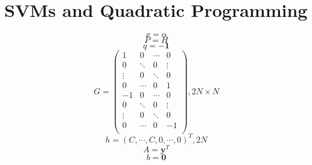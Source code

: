 \documentclass[11pt,abstract=on]{scrartcl}
\begin{document}
\section{SVMs and Quadratic Programming}
\begin{equation*}
x= \alpha
\end{equation*}
\begin{equation*}
P=H
\end{equation*}
\begin{equation*}
q=-\boldsymbol{1}
\end{equation*}
\begin{equation*}
G=\left( \begin{array}{rrrr}
1 & 0 & \cdots & 0 \\
0 & \ddots & 0 & \vdots \\
\vdots & 0 & \ddots & 0 \\
0 & \cdots & 0 & 1 \\
-1 & 0 & \cdots & 0 \\
0 & \ddots & 0 & \vdots \\
\vdots & 0 & \ddots & 0 \\
0 & \cdots & 0 & -1 \\
\end{array}\right), 2N\times N 
\end{equation*}
\begin{equation*}
 h = (C,\cdots,C,0,\cdots,0)^T,2N
\end{equation*}
\begin{equation*}
A=\boldsymbol{y}^T
\end{equation*}
\begin{equation*}
b = \boldsymbol{0}
\end{equation*}
\end{document}
